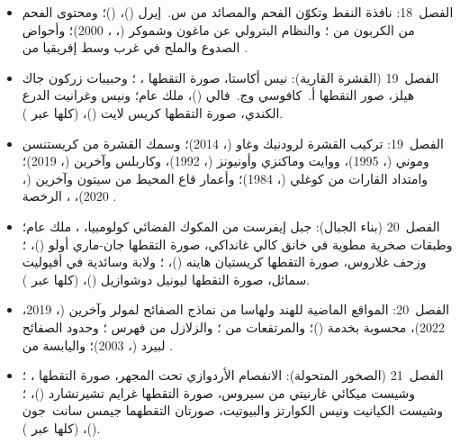 \begin{itemize}
  \item الفصل~18: نافذة النفط وتكوّن الفحم والمصائد من س.~إيرل ()،  ()؛ ومحتوى الفحم من الكربون من ؛ والنظام البترولي عن ماغون وشموكر (، ، 2000)؛ وأحواض الصدوع والملح في غرب وسط إفريقيا من .
  \item الفصل~19 (القشرة القارية): نيس أكاستا، صورة التقطها ، ؛ وحبيبات زركون جاك هيلز، صور التقطها أ.~كافوسي وج.~فالي ()، ملك عام؛ ونيس وغرانيت الدرع الكندي، صورة التقطها كريس لايت ()،  (كلها عبر ).
  \item الفصل~19: تركيب القشرة لرودنيك وغاو (، 2014)؛ وسمك القشرة من كريستنسن وموني (، 1995)، ووايت وماكنزي وأونيونز (، 1992)، وكاربلس وآخرين (، 2019)؛ وامتداد القارات من كوغلي (، 1984)؛ وأعمار قاع المحيط من سيتون وآخرين (، 2020)، ، الرخصة .
  \item الفصل~20 (بناء الجبال): جبل إيفرست من المكوك الفضائي كولومبيا، ، ملك عام؛ وطبقات صخرية مطوية في خانق كالي غانداكي، صورة التقطها جان-ماري أولو ()، ؛ وزحف غلاروس، صورة التقطها كريستيان هاينه ()، ؛ ولابة وسائدية في أفيوليت سمائل، صورة التقطها ليونيل دوشوازيل ()،  (كلها عبر ).
  \item الفصل~20: المواقع الماضية للهند ولهاسا من نماذج الصفائح لمولر وآخرين (، 2019، 2022)، محسوبة بخدمة  ()؛ والمرتفعات من ؛ والزلازل من فهرس ؛ وحدود الصفائح لبيرد (، 2003)؛ واليابسة من .
  \item الفصل~21 (الصخور المتحولة): الانفصام الأردوازي تحت المجهر، صورة التقطها ، ؛ وشيست ميكائي غارنيتي من سيروس، صورة التقطها غرايم تشيرتشارد ()، ؛ وشيست الكيانيت ونيس الكوارتز والبيوتيت، صورتان التقطهما جيمس سانت~جون ()،  (كلها عبر ).

\end{itemize}
